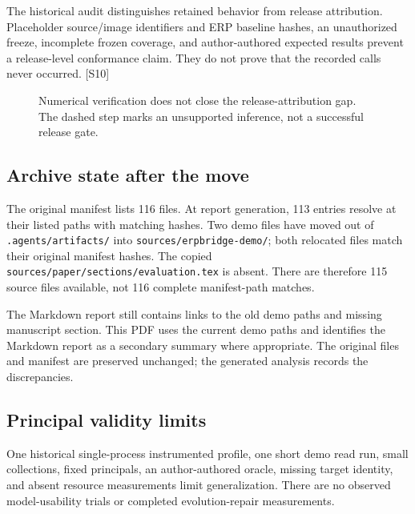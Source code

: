The historical audit distinguishes retained behavior from release attribution. Placeholder source/image identifiers and ERP baseline hashes, an unauthorized freeze, incomplete frozen coverage, and author-authored expected results prevent a release-level conformance claim. They do not prove that the recorded calls never occurred. [S10]

\begin{figure}[h]\centering\caption{Numerical verification does not close the release-attribution gap. The dashed step marks an unsupported inference, not a successful release gate.}\label{fig:provenance}\end{figure}

\subsection*{Archive state after the move}
The original manifest lists 116 files. At report generation, 113 entries resolve at their listed paths with matching hashes. Two demo files have moved out of \texttt{.agents/artifacts/} into \texttt{sources/erpbridge-demo/}; both relocated files match their original manifest hashes. The copied \texttt{sources/paper/sections/evaluation.tex} is absent. There are therefore 115 source files available, not 116 complete manifest-path matches.

The Markdown report still contains links to the old demo paths and missing manuscript section. This PDF uses the current demo paths and identifies the Markdown report as a secondary summary where appropriate. The original files and manifest are preserved unchanged; the generated analysis records the discrepancies.

\subsection*{Principal validity limits}
One historical single-process instrumented profile, one short demo read run, small collections, fixed principals, an author-authored oracle, missing target identity, and absent resource measurements limit generalization. There are no observed model-usability trials or completed evolution-repair measurements.

